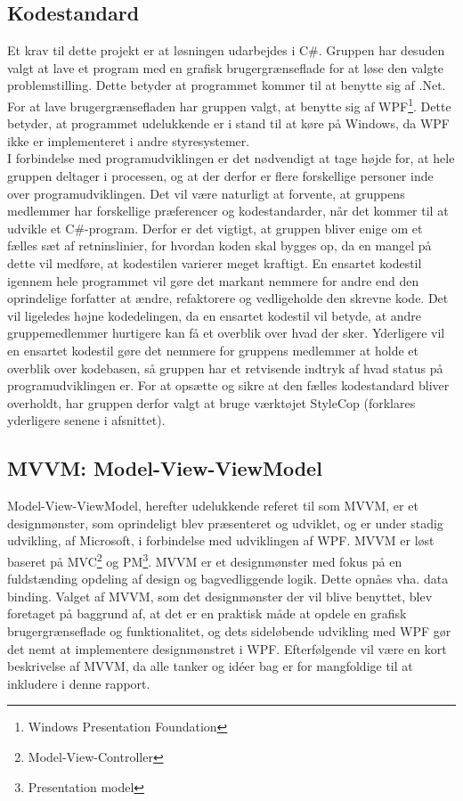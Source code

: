 \subsection{Kodestandard}
Et krav til dette projekt er at løsningen udarbejdes i C\#. Gruppen har desuden valgt at lave et program med en grafisk brugergrænseflade for at løse den valgte problemstilling. Dette betyder at programmet kommer til at benytte sig af .Net. For at lave brugergrænsefladen har gruppen valgt, at benytte sig af WPF\footnote{Windows Presentation Foundation}. Dette betyder, at programmet udelukkende er i stand til at køre på Windows, da WPF ikke er implementeret i andre styresystemer.\\

I forbindelse med programudviklingen er det nødvendigt at tage højde for, at hele gruppen deltager i processen, og at der derfor er flere forskellige personer inde over programudviklingen. Det vil være naturligt at forvente, at gruppens medlemmer har forskellige præferencer og kodestandarder, når det kommer til at udvikle et C\#-program. Derfor er det vigtigt, at gruppen bliver enige om et fælles sæt af retninslinier, for hvordan koden skal bygges op, da en mangel på dette vil medføre, at kodestilen varierer meget kraftigt. En ensartet kodestil igennem hele programmet vil gøre det markant nemmere for andre end den oprindelige forfatter at ændre, refaktorere og vedligeholde den skrevne kode. Det vil ligeledes højne kodedelingen, da en ensartet kodestil vil betyde, at andre gruppemedlemmer hurtigere kan få et overblik over hvad der sker. Yderligere vil en ensartet kodestil gøre det nemmere for gruppens medlemmer at holde et overblik over kodebasen, så gruppen har et retvisende indtryk af hvad status på programudviklingen er.
For at opsætte og sikre at den fælles kodestandard bliver overholdt, har gruppen derfor valgt at bruge værktøjet StyleCop (forklares yderligere senene i afsnittet).

\subsection{MVVM: Model-View-ViewModel}
\label{sec:MVVM}

Model-View-ViewModel, herefter udelukkende referet til som MVVM, er et designmønster, som oprindeligt blev præsenteret og udviklet, og er under stadig udvikling, af Microsoft, i forbindelse med udviklingen af WPF. MVVM er løst baseret på MVC\footnote{Model-View-Controller} og PM\footnote{Presentation model}\cite{mvvm_msdn}. MVVM er et designmønster med fokus på en fuldstænding opdeling af design og bagvedliggende logik. Dette opnåes vha. data binding. Valget af MVVM, som det designmønster der vil blive benyttet, blev foretaget på baggrund af, at det er en praktisk måde at opdele en grafisk brugergrænseflade og funktionalitet, og dets sideløbende udvikling med WPF gør det nemt at implementere designmønstret i WPF. Efterfølgende vil være en kort beskrivelse af MVVM, da alle tanker og idéer bag er for mangfoldige til at inkludere i denne rapport.

